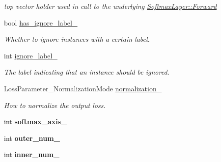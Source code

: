 \begin{DoxyCompactItemize}
\begin{DoxyCompactList}\small\item\em top vector holder used in call to the underlying \hyperlink{classcaffe_1_1Layer_aa5fc9ddb31b58958653372bdaaccde94}{Softmax\+Layer\+::\+Forward} \end{DoxyCompactList}\item 
bool \hyperlink{classcaffe_1_1SoftmaxWithLossLayer_ad77bc32fa576ad025102d29acf79aefb}{has\+\_\+ignore\+\_\+label\+\_\+}\hypertarget{classcaffe_1_1SoftmaxWithLossLayer_ad77bc32fa576ad025102d29acf79aefb}{}\label{classcaffe_1_1SoftmaxWithLossLayer_ad77bc32fa576ad025102d29acf79aefb}

\begin{DoxyCompactList}\small\item\em Whether to ignore instances with a certain label. \end{DoxyCompactList}\item 
int \hyperlink{classcaffe_1_1SoftmaxWithLossLayer_a117d31c7ac538dd7851fb493bfc75d95}{ignore\+\_\+label\+\_\+}\hypertarget{classcaffe_1_1SoftmaxWithLossLayer_a117d31c7ac538dd7851fb493bfc75d95}{}\label{classcaffe_1_1SoftmaxWithLossLayer_a117d31c7ac538dd7851fb493bfc75d95}

\begin{DoxyCompactList}\small\item\em The label indicating that an instance should be ignored. \end{DoxyCompactList}\item 
Loss\+Parameter\+\_\+\+Normalization\+Mode \hyperlink{classcaffe_1_1SoftmaxWithLossLayer_a4b1fa348fc885339931f132573467b81}{normalization\+\_\+}\hypertarget{classcaffe_1_1SoftmaxWithLossLayer_a4b1fa348fc885339931f132573467b81}{}\label{classcaffe_1_1SoftmaxWithLossLayer_a4b1fa348fc885339931f132573467b81}

\begin{DoxyCompactList}\small\item\em How to normalize the output loss. \end{DoxyCompactList}\item 
int {\bfseries softmax\+\_\+axis\+\_\+}\hypertarget{classcaffe_1_1SoftmaxWithLossLayer_a700e28793c5b187de36b935744f5785c}{}\label{classcaffe_1_1SoftmaxWithLossLayer_a700e28793c5b187de36b935744f5785c}

\item 
int {\bfseries outer\+\_\+num\+\_\+}\hypertarget{classcaffe_1_1SoftmaxWithLossLayer_aaabb753438f6877c7a61a52b56b19a1d}{}\label{classcaffe_1_1SoftmaxWithLossLayer_aaabb753438f6877c7a61a52b56b19a1d}

\item 
int {\bfseries inner\+\_\+num\+\_\+}\hypertarget{classcaffe_1_1SoftmaxWithLossLayer_a1fb0bb2aa77585f49be951062c82a9fd}{}\label{classcaffe_1_1SoftmaxWithLossLayer_a1fb0bb2aa77585f49be951062c82a9fd}

\end{DoxyCompactItemize}


